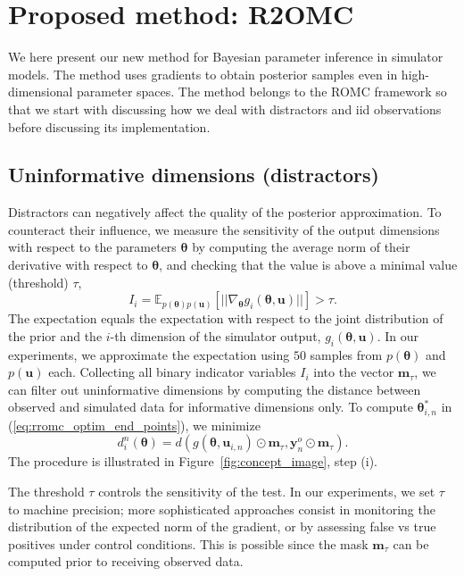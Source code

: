 \documentclass[twoside]{article}
\newcommand{\thb}{\boldsymbol{\theta}}
\newcommand{\ub}{\mathbf{u}}
\newcommand{\data}{\mathbf{y}^o}
\newcommand{\E}{\mathbb{E}}
\newcommand{\rromc}{R2OMC}
\newcommand{\mask}{\mathbf{m}_\tau}
\begin{document}
\section{Proposed method: \rromc}
\label{sec:rromc}

We here present our new method for Bayesian parameter inference in simulator models. The method uses gradients to obtain posterior samples even in high-dimensional parameter spaces. The method belongs to the ROMC framework so that we start with discussing how we deal with distractors and iid observations before discussing its implementation.

\subsection{Uninformative dimensions (distractors)}
\label{subsec:distractors}
Distractors can negatively affect the quality of the posterior approximation. To counteract their influence, we measure the sensitivity of the output dimensions with respect to the parameters $\thb$ by computing the average norm of their derivative with respect to $\thb$, and checking that the value is above a minimal value (threshold) $\tau$, 
\begin{equation}
  \label{eq:informative_dimensions}
  I_i = \E_{p(\thb)p(\ub)}\left[ || \nabla_{\thb} g_i(\thb, \ub) || \right] > \tau.
\end{equation}
The expectation equals the expectation with respect to the joint distribution of the prior and the $i$-th dimension of the simulator output, $g_i(\thb, \ub)$. In our experiments, we approximate the expectation using $50$ samples from $p(\thb)$ and $p(\ub)$ each. Collecting all binary indicator variables $I_i$ into the vector $\mask$, we can filter out uninformative dimensions by computing the distance between observed and simulated data for informative dimensions only. To compute $\thb_{i,n}^*$ in (\ref{eq:rromc_optim_end_points}), we minimize
\begin{equation}
d_i^n(\thb) = d(g(\thb, \ub_{i,n})\odot \mask, \data_n \odot \mask).
\label{eq:rromc-masked-distance}
\end{equation}
The procedure is illustrated in Figure~\ref{fig:concept_image}, step (i). 

The threshold $\tau$ controls the sensitivity of the test. In our experiments, we set $\tau$ to machine precision; more sophisticated approaches consist in monitoring the distribution of the expected norm of the gradient, or by assessing false vs true positives under control conditions. This is possible since the mask $\mask$ can be computed prior to receiving observed data.
\end{document}
